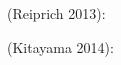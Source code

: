\documentclass[manuscript]{aastex}
\begin{document}
(Reiprich 2013):





(Kitayama 2014):



\end{document}
